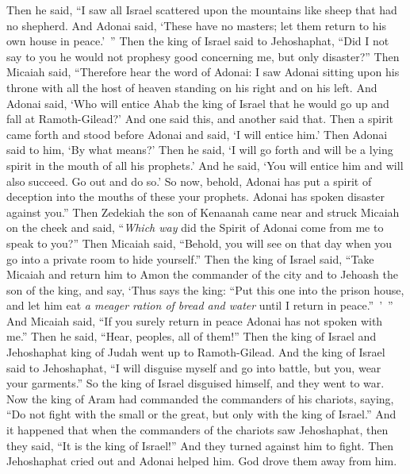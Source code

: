 \begin{biblechapter}
\verse Then he said, “I saw all Israel scattered upon the mountains like sheep that had no shepherd. And Adonai said, ‘These have no masters; let them return to his own house in peace.’ ”
\verse Then the king of Israel said to Jehoshaphat, “Did I not say to you he would not prophesy good concerning me, but only disaster?”
\verse Then Micaiah said, “Therefore hear the word of Adonai: I saw Adonai sitting upon his throne with all the host of heaven standing on his right and on his left.
\verse And Adonai said, ‘Who will entice Ahab the king of Israel that he would go up and fall at Ramoth-Gilead?’ And one said this, and another said that.
\verse Then a spirit came forth and stood before Adonai and said, ‘I will entice him.’ Then Adonai said to him, ‘By what means?’
\verse Then he said, ‘I will go forth and will be a lying spirit in the mouth of all his prophets.’ And he said, ‘You will entice him and will also succeed. Go out and do so.’
\verse So now, behold, Adonai has put a spirit of deception into the mouths of these your prophets. Adonai has spoken disaster against you.”
\verse Then Zedekiah the son of Kenaanah came near and struck Micaiah on the cheek and said, “\textit{Which way} did the Spirit of Adonai come from me to speak to you?”
\verse Then Micaiah said, “Behold, you will see on that day when you go into a private room to hide yourself.”
\verse Then the king of Israel said, “Take Micaiah and return him to Amon the commander of the city and to Jehoash the son of the king,
\verse and say, ‘Thus says the king: “Put this one into the prison house, and let him eat \textit{a meager ration of bread and water} until I return in peace.” ’ ”
\verse And Micaiah said, “If you surely return in peace Adonai has not spoken with me.” Then he said, “Hear, peoples, all of them!”
 Then the king of Israel and Jehoshaphat king of Judah went up to Ramoth-Gilead.
\verse And the king of Israel said to Jehoshaphat, “I will disguise myself and go into battle, but you, wear your garments.” So the king of Israel disguised himself, and they went to war.
\verse Now the king of Aram had commanded the commanders of his chariots, saying, “Do not fight with the small or the great, but only with the king of Israel.”
\verse And it happened that when the commanders of the chariots saw Jehoshaphat, then they said, “It is the king of Israel!” And they turned against him to fight. Then Jehoshaphat cried out and Adonai helped him. God drove them away from him.

\end{biblechapter}
